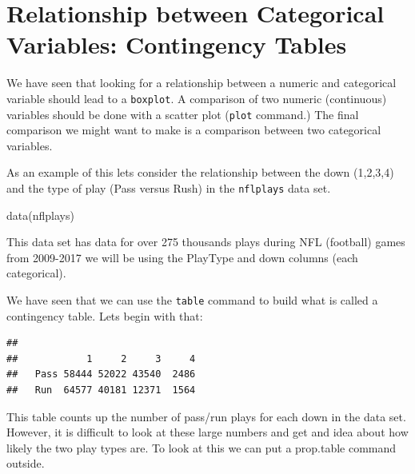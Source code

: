 \documentclass[
]{book}
\newenvironment{Shaded}{\begin{snugshade}}{\end{snugshade}}
\newcommand{\FunctionTok}[1]{\textcolor[rgb]{0.00,0.00,0.00}{#1}}
\newcommand{\NormalTok}[1]{#1}
\newcommand{\SpecialCharTok}[1]{\textcolor[rgb]{0.00,0.00,0.00}{#1}}
\theoremstyle{definition}
\theoremstyle{definition}
\theoremstyle{definition}
\theoremstyle{definition}
\theoremstyle{remark}
\begin{document}
\hypertarget{relationship-between-categorical-variables-contingency-tables}{%
\section{Relationship between Categorical Variables: Contingency Tables}\label{relationship-between-categorical-variables-contingency-tables}}

We have seen that looking for a relationship between a numeric and categorical variable should lead to a \texttt{boxplot}. A comparison of two numeric (continuous) variables should be done with a scatter plot (\texttt{plot} command.) The final comparison we might want to make is a comparison between two categorical variables.

As an example of this lets consider the relationship between the down (1,2,3,4) and the type of play (Pass versus Rush) in the \texttt{nflplays} data set.

\begin{Shaded}
\begin{Highlighting}[]
\FunctionTok{data}\NormalTok{(nflplays)}
\end{Highlighting}
\end{Shaded}

This data set has data for over 275 thousands plays during NFL (football) games from 2009-2017 we will be using the PlayType and down columns (each categorical).

We have seen that we can use the \texttt{table} command to build what is called a contingency table. Lets begin with that:

\begin{Shaded}
\end{Shaded}

\begin{verbatim}
##       
##            1     2     3     4
##   Pass 58444 52022 43540  2486
##   Run  64577 40181 12371  1564
\end{verbatim}

This table counts up the number of pass/run plays for each down in the data set. However, it is difficult to look at these large numbers and get and idea about how likely the two play types are. To look at this we can put a prop.table command outside.
\end{document}
